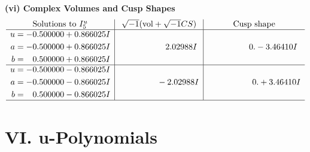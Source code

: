 \documentclass[1p]{elsarticle_modified}
\theoremstyle{definition}
\newcommand{\I}{\sqrt{-1}}
\begin{document}
\newpage\flushleft \textbf{(vi) Complex Volumes and Cusp Shapes}
$$\begin{array}{c|c|c}  
\text{Solutions to }I^u_{5}& \I (\text{vol} + \sqrt{-1}CS) & \text{Cusp shape}\\
 \hline 
\begin{aligned}
u &= -0.500000 + 0.866025 I \\
a &= -0.500000 + 0.866025 I \\
b &= \phantom{-}0.500000 + 0.866025 I\end{aligned}
 & \phantom{-0.000000 -}2.02988 I & \phantom{-0.000000 } 0. - 3.46410 I \\ \hline\begin{aligned}
u &= -0.500000 - 0.866025 I \\
a &= -0.500000 - 0.866025 I \\
b &= \phantom{-}0.500000 - 0.866025 I\end{aligned}
 & \phantom{-0.000000 } -2.02988 I & \phantom{-0.000000 -}0. + 3.46410 I\\
 \hline 
 \end{array}$$\newpage
\newpage\renewcommand{\arraystretch}{1}
\centering \section*{ VI. u-Polynomials}
\end{document}

